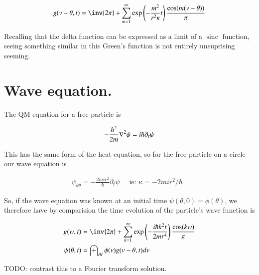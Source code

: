 \documentclass{article}
\DeclareMathOperator{\sinc}{sinc}
\begin{document}
\begin{align*}
g( v - \theta, t ) &= \inv{2 \pi} + \sum_{m=1}^\infty \exp\left(- \frac{m^2}{ r^2 \kappa } t \right) \frac{\cos(m (v -\theta))}{\pi} \\
\end{align*}

Recalling that the delta function can be expressed as a limit of a $\sinc$ function, seeing something similar
in this Green's function is not entirely unsuprising seeming.

\section{ Wave equation. }

The QM equation for a free particle is

\begin{align*}
-\frac{\hbar^2}{2m} \nabla^2 \psi = i \hbar \partial_t \psi
\end{align*}

This has the same form of the heat equation, so for the free particle on a circle our wave equation is

\begin{align*}
\psi_{\theta\theta} = - \frac{2 m i r^2 }{\hbar} \partial_t \psi \quad \mbox{ ie: $\kappa = - 2 m i r^2 /\hbar$ }
\end{align*}

So, if the wave equation was known at an initial time $\psi(\theta, 0) = \phi(\theta)$, we therefore have by comparision the time 
evolution of the particle's wave function is

\begin{align*}
g( w, t ) &= \inv{2 \pi} + \sum_{k=1}^\infty \exp\left(- \frac{i \hbar k^2 t}{ 2 m r^4 } \right) \frac{\cos(k w )}{\pi} \\
\psi(\theta, t) &= \int_{\partial I} \phi(v) g(v - \theta, t) dv 
\end{align*}

TODO: contrast this to a Fourier transform solution.

%
%
\end{document}
